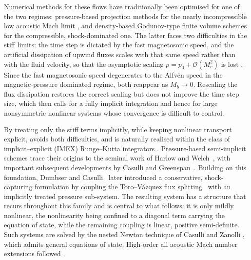 \documentclass[a4paper,fleqn]{cas-sc}
\theoremstyle{definition}
\theoremstyle{remark}
\begin{document}
Numerical methods for these flows have traditionally been optimised for one of the two
regimes: pressure-based projection methods for the nearly incompressible low acoustic Mach limit
\cite{Chorin1968}, and density-based Godunov-type finite volume schemes
\cite{BrioWu1988,MiyoshiKusano2005} for the compressible, shock-dominated one. The
latter faces two difficulties in the stiff limits: the time step is dictated by the
fast magnetosonic speed, and the artificial dissipation of upwind fluxes scales with
that same speed rather than with the fluid velocity, so that the asymptotic scaling $p
= p_0 + \mathcal{O}(M_c^2)$ is lost \cite{GuillardViozat2017,Dellacherie2010}. Since
the fast magnetosonic speed degenerates to the Alfv\'en speed in the
magnetic-pressure dominated regime, both reappear as $M_b \to 0$. Rescaling the flux
dissipation \cite{barsukow2021truly,barsukow2023all} restores the correct scaling but does not improve the time step size, which then calls for a fully implicit integration
\cite{leidi2022finite,viallet2011towards} and hence for large nonsymmetric nonlinear
systems whose convergence is difficult to control.

By treating only the stiff terms implicitly, while keeping nonlinear transport
explicit, avoids both difficulties, and is naturally realised within the class of
implicit--explicit (IMEX) Runge--Kutta integrators
\cite{RKIMEX,RKIMEX2}. Pressure-based semi-implicit schemes trace their origins to the seminal work of
Harlow and Welch~\cite{HarlowWelch1965}, with important subsequent developments by
Casulli and Greenspan~\cite{CasulliGreenspan1984}. Building on this foundation, Dumbser
and Casulli~\cite{DumbserCasulli2016} later introduced a conservative, shock-capturing
formulation by coupling the Toro--V\'azquez flux splitting~\cite{ToroVazquez2012} with an
implicitly treated pressure sub-system. The
resulting system has a structure that recurs throughout this family and is central to
what follows: it is only mildly nonlinear, the nonlinearity being confined to a
diagonal term carrying the equation of state, while the remaining coupling is linear, positive semi-definite. Such systems are solved by the nested Newton
technique of Casulli and Zanolli \cite{CasulliZanolli2012}, which admits general
equations of state. High-order all acoustic Mach number extensions followed
\cite{BoscheriPareschi2021,TavelliDumbser2017}.
\end{document}
